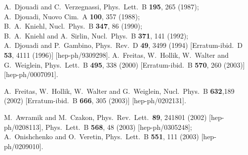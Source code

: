 \documentclass[Physsubmission, Phys]{SciPost}
\begin{document}
\begin{thebibliography}{100}
A.~Djouadi and C.~Verzegnassi,
Phys.\ Lett.\ B {\bf 195}, 265 (1987); \\%
A.~Djouadi,
Nuovo Cim.\ A {\bf 100}, 357 (1988); \\%
B.~A.~Kniehl,
Nucl.\ Phys.\ B {\bf 347}, 86 (1990); \\%
B.~A.~Kniehl and A.~Sirlin,
Nucl.\ Phys.\ B {\bf 371}, 141 (1992);\\ %
A.~Djouadi and P.~Gambino,
Phys.\ Rev.\ D {\bf 49}, 3499 (1994)
[Erratum-ibid.\ D {\bf 53}, 4111 (1996)]
    [hep-ph/9309298].
A.~Freitas, W.~Hollik, W.~Walter and G.~Weiglein,
Phys.\ Lett.\ B {\bf 495}, 338 (2000)
[Erratum-ibid.\ B {\bf 570}, 260 (2003)]
[hep-ph/0007091]. %

A.~Freitas, W.~Hollik, W.~Walter and G.~Weiglein,
Nucl.\ Phys.\ B {\bf 632},189 (2002)
[Erratum-ibid.\ B {\bf 666}, 305 (2003)]
  [hep-ph/0202131].

M.~Awramik and M.~Czakon,
Phys.\ Rev.\ Lett.\  {\bf 89}, 241801 (2002)
[hep-ph/0208113],
Phys.\ Lett.\ B {\bf 568}, 48 (2003)
[hep-ph/0305248]; \\
A.~Onishchenko and O.~Veretin,
Phys.\ Lett.\ B {\bf 551}, 111 (2003)
[hep-ph/0209010].


\end{thebibliography}
\end{document}
